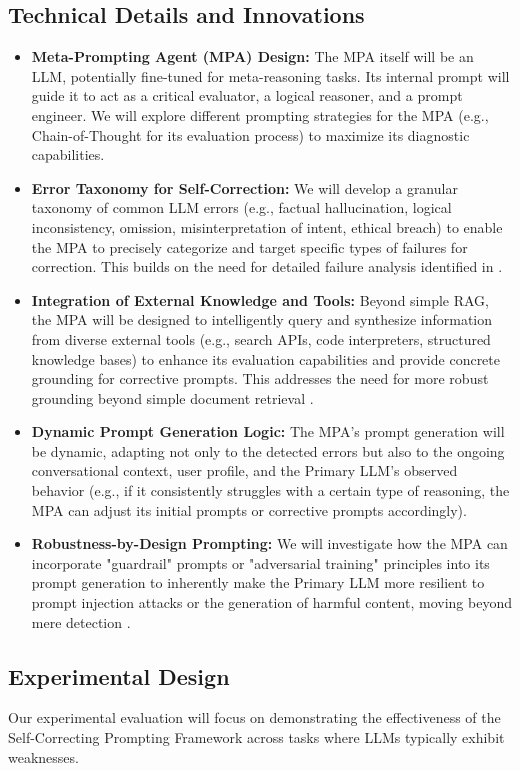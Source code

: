 \documentclass{article}
\begin{document}
\subsection{Technical Details and Innovations}
\begin{itemize}
    \item \textbf{Meta-Prompting Agent (MPA) Design:} The MPA itself will be an LLM, potentially fine-tuned for meta-reasoning tasks. Its internal prompt will guide it to act as a critical evaluator, a logical reasoner, and a prompt engineer. We will explore different prompting strategies for the MPA (e.g., Chain-of-Thought for its evaluation process) to maximize its diagnostic capabilities.
    \item \textbf{Error Taxonomy for Self-Correction:} We will develop a granular taxonomy of common LLM errors (e.g., factual hallucination, logical inconsistency, omission, misinterpretation of intent, ethical breach) to enable the MPA to precisely categorize and target specific types of failures for correction. This builds on the need for detailed failure analysis identified in \cite{P1}.
    \item \textbf{Integration of External Knowledge and Tools:} Beyond simple RAG, the MPA will be designed to intelligently query and synthesize information from diverse external tools (e.g., search APIs, code interpreters, structured knowledge bases) to enhance its evaluation capabilities and provide concrete grounding for corrective prompts. This addresses the need for more robust grounding beyond simple document retrieval \cite{P5}.
    \item \textbf{Dynamic Prompt Generation Logic:} The MPA's prompt generation will be dynamic, adapting not only to the detected errors but also to the ongoing conversational context, user profile, and the Primary LLM's observed behavior (e.g., if it consistently struggles with a certain type of reasoning, the MPA can adjust its initial prompts or corrective prompts accordingly).
    \item \textbf{Robustness-by-Design Prompting:} We will investigate how the MPA can incorporate "guardrail" prompts or "adversarial training" principles into its prompt generation to inherently make the Primary LLM more resilient to prompt injection attacks or the generation of harmful content, moving beyond mere detection \cite{P3}.
\end{itemize}

\subsection{Experimental Design}
Our experimental evaluation will focus on demonstrating the effectiveness of the Self-Correcting Prompting Framework across tasks where LLMs typically exhibit weaknesses.
\end{document}
